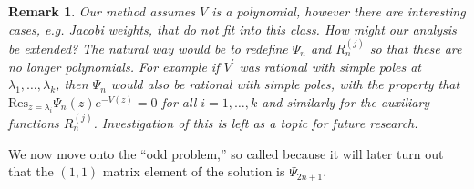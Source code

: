 \documentclass[12pt]{article}
\newtheorem{remark}[theorem]{Remark}
\theoremstyle{definition}
\begin{document}
\begin{remark} Our method assumes $V$ is a polynomial, however there are interesting cases, e.g. Jacobi weights, that do not fit into this class.  How might our analysis be extended? The natural way would be to redefine $\Psi_n$ and $R_n^{(j)}$ so that these are no longer polynomials. For example if $V^\prime$ was rational with simple poles at $\lambda_1, \dots, \lambda_k$,  then $\Psi_n$ would also be rational with simple poles, with the property that $\mathrm{Res}_{z = \lambda_i} \Psi_{n}(z) e^{-V(z)} = 0$ for all $i=1,\dots, k$ and similarly for the auxiliary functions $R^{(j)}_n$. Investigation of this is left as a topic for future research.
\end{remark}
We now move onto the \enquote{odd problem,} so called because it will later turn out that the $(1,1)$ matrix element of the solution is $\Psi_{2n+1}$.
\end{document}
